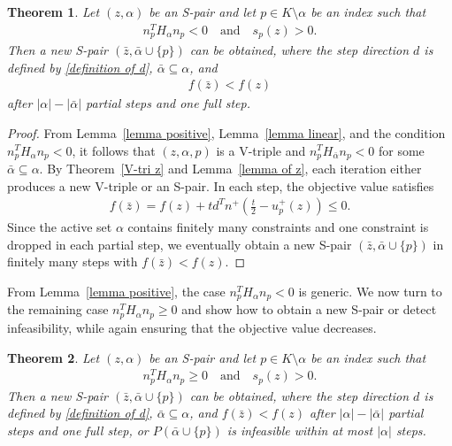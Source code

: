 \documentclass{article}
\newtheorem{theorem}{Theorem}
\begin{document}
	\begin{theorem}\label{theorem <}
		Let $(z, \alpha)$ be an S-pair and let $p \in K \setminus \alpha$ be an index such that 
		\begin{align*}
		n_{p}^{T}H_{\alpha}n_{p} < 0 \quad \text{and} \quad s_{p}(z) > 0.
		\end{align*}
		Then a new S-pair $(\bar{z}, \bar{\alpha}\cup\{p\})$ can be obtained, where the step direction $d$ is defined by \eqref{definition of d}, $\bar{\alpha} \subseteq \alpha$, and 
		\begin{align*}
		f(\bar{z}) < f(z)
		\end{align*}
		after $|\alpha| - |\bar{\alpha}|$ partial steps and one full step.
	\end{theorem}
	
	\begin{proof}
		From Lemma~\ref{lemma positive}, Lemma~\ref{lemma linear}, and the condition $n_{p}^{T}H_{\alpha}n_{p} < 0$, it follows that $(z, \alpha, p)$ is a V-triple and $n_{p}^{T}H_{\bar{\alpha}}n_{p} < 0$ for some $\bar{\alpha} \subseteq \alpha$. 
		By Theorem~\ref{V-tri z} and Lemma~\ref{lemma of z}, each iteration either produces a new V-triple or an S-pair. 
		In each step, the objective value satisfies
		\begin{align*}
		f(\bar{z}) = f(z) + t d^{T}n^{+}\left(\tfrac{t}{2} - u_{p}^{+}(z)\right) \le 0.
		\end{align*}
		Since the active set $\alpha$ contains finitely many constraints and one constraint is dropped in each partial step, we eventually obtain a new S-pair $(\bar{z}, \bar{\alpha}\cup\{p\})$ in finitely many steps with $f(\bar{z}) < f(z)$.
	\end{proof}
	
	From Lemma~\ref{lemma positive}, the case $n_{p}^{T}H_{\alpha}n_{p} < 0$ is generic. 
	We now turn to the remaining case $n_{p}^{T}H_{\alpha}n_{p} \ge 0$ and show how to obtain a new S-pair or detect infeasibility, while again ensuring that the objective value decreases.
	
	\begin{theorem}\label{theorem >=}
		Let $(z, \alpha)$ be an S-pair and let $p \in K \setminus \alpha$ be an index such that
		\begin{align*}
		n_{p}^{T}H_{\alpha}n_{p} \ge 0 \quad \text{and} \quad s_{p}(z) > 0.
		\end{align*}
		Then a new S-pair $(\bar{z}, \bar{\alpha}\cup\{p\})$ can be obtained, where the step direction $d$ is defined by \eqref{definition of d}, $\bar{\alpha} \subseteq \alpha$, and $f(\bar{z}) < f(z)$ after $|\alpha| - |\bar{\alpha}|$ partial steps and one full step, 
		or $P(\bar{\alpha}\cup\{p\})$ is infeasible within at most $|\alpha|$ steps.
	\end{theorem}
	
\end{document}
